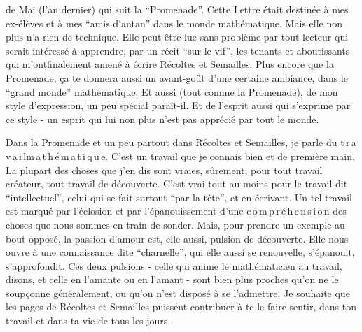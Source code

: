 

de Mai  (l'an dernier) qui suit la ``Promenade''. Cette Lettre était destinée à mes ex-élèves et à mes ``amis d'antan'' dans le monde mathématique. Mais elle non plus n'a rien de technique. Elle peut être lue sans problème par tout lecteur qui serait intéressé à apprendre, par un récit ``sur le vif'', les tenants et aboutissants qui m'ontfinalement amené à écrire Récoltes et Semailles. Plus encore que la Promenade, ça te donnera aussi un avant-goût d'une certaine ambiance, dans le ``grand monde'' mathématique. Et aussi (tout comme la Promenade), de mon style d'expression, un peu spécial paraît-il. Et de l'esprit aussi qui s'exprime par ce style - un esprit qui lui non plus n'est pas apprécié par tout le monde.

Dans la Promenade et un peu partout dans Récoltes et Semailles, je parle du t\,r\,a\,v\,a\,i\,l\quad m\,a\,t\,h\,é\,m\,a\,t\,i\,q\,u\,e. C'est un travail que je connais bien et de première main. La plupart des choses que j'en dis sont vraies, sûrement, pour tout travail créateur, tout travail de découverte. C'est vrai tout au moins pour le travail dit ``intellectuel'', celui qui se fait surtout ``par la tête'', et en écrivant. Un tel travail est marqué par l'éclosion et par l'épanouissement d'une c\,o\,m\,p\,r\,é\,h\,e\,n\,s\,i\,o\,n des choses que nous sommes en train de sonder. Mais, pour prendre un exemple au bout opposé, la passion d'amour est, elle aussi, pulsion de découverte. Elle nous ouvre à une connaissance dite ``charnelle'', qui elle aussi se renouvelle, s'épanouit, s'approfondit. Ces deux pulsions - celle qui anime le mathématicien au travail, disons, et celle en l'amante ou en l'amant - sont bien plus proches qu'on ne le soupçonne généralement, ou qu'on n'est disposé à se l'admettre. Je souhaite que les pages de Récoltes et Semailles puissent contribuer à te le faire sentir, dans ton travail et dans ta vie de tous les jours.

